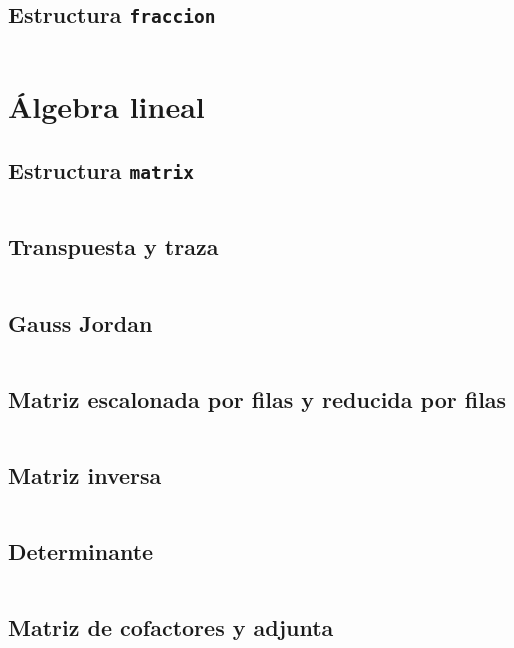 \documentclass[11pt]{article}
\begin{document}
		\subsection{Estructura \texttt{fraccion}}
		\inputminted[tabsize=2,breaklines,firstline=7,lastline=123,fontsize=\small]{c++}{fraccion.cpp}
		
	\newpage
	\section{Álgebra lineal}
		\subsection{Estructura \texttt{matrix}}
		\inputminted[tabsize=2,breaklines,firstline=7,lastline=130,fontsize=\small]{c++}{matrix.cpp}
		
		\subsection{Transpuesta y traza}
		\inputminted[tabsize=2,breaklines,firstline=132,lastline=145,fontsize=\small]{c++}{matrix.cpp}
		
		\subsection{Gauss Jordan}
		\inputminted[tabsize=2,breaklines,firstline=147,lastline=190,fontsize=\small]{c++}{matrix.cpp}
		
		\subsection{Matriz escalonada por filas y reducida por filas}
		\inputminted[tabsize=2,breaklines,firstline=192,lastline=202,fontsize=\small]{c++}{matrix.cpp}
		
		\subsection{Matriz inversa}
		\inputminted[tabsize=2,breaklines,firstline=204,lastline=225,fontsize=\small]{c++}{matrix.cpp}
		
		\subsection{Determinante}
		\inputminted[tabsize=2,breaklines,firstline=227,lastline=240,fontsize=\small]{c++}{matrix.cpp}
		
		\subsection{Matriz de cofactores y adjunta}
		\inputminted[tabsize=2,breaklines,firstline=242,lastline=267,fontsize=\small]{c++}{matrix.cpp}
		
\end{document}
